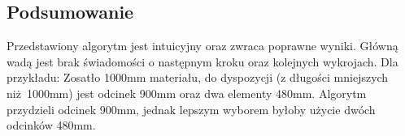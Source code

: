 \subsection{Podsumowanie}
Przedstawiony algorytm jest intuicyjny oraz zwraca poprawne wyniki. Główną wadą jest brak świadomości o następnym kroku oraz kolejnych wykrojach. Dla przykładu: Zosatło 1000mm materiału, do dyspozycji (z długości mniejszych niż 1000mm) jest odcinek 900mm oraz dwa elementy 480mm. Algorytm przydzieli odcinek 900mm, jednak lepszym wyborem byłoby użycie dwóch odcinków 480mm.
